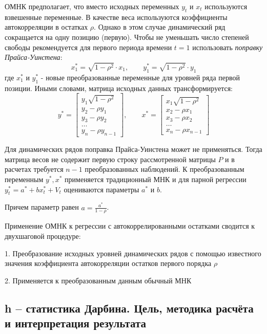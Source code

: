 \documentclass[aps,%
12pt,%
final,%
oneside,
onecolumn,%
musixtex, %
superscriptaddress,%
centertags]{article} %
\theoremstyle{plain}
\theoremstyle{definition}
\theoremstyle{remark}
\begin{document}
ОМНК предполагает, что вместо исходных переменных $y_t$ и $x_t$ используются взвешенные переменные. В качестве веса используются коэффициенты автокорреляции в остатках $\rho$. Однако в этом случае динамический ряд сокращается на одну позицию (первую). Чтобы не уменьшать число степеней свободы рекомендуется для первого периода времени $t=1$ использовать \textit{поправку Прайса-Уинстена}:
$$x_1^* = \sqrt{1-\rho^2} \cdot x_1, \qquad y_1^* = \sqrt{1-\rho^2} \cdot y_1$$
где $x_1^*$ и $y_1^*$ - новые преобразованные переменные для уровней ряда первой позиции. Иными словами, матрица исходных данных трансформируется:
$$ y^* = \begin{bmatrix}
	y_1 \sqrt{1-\rho^2} \\
	y_2 - \rho y_1 \\ 
	y_3 -\rho y_2 \\
	\ldots \\
	y_n -\rho y_{n-1}
\end{bmatrix}, \qquad
x^* = \begin{bmatrix}
	x_1 \sqrt{1-\rho^2} \\
	x_2 - \rho x_1 \\ 
	x_3 -\rho x_2 \\
	\ldots \\
	x_n -\rho x_{n-1}
\end{bmatrix}$$

Для динамических рядов поправка Прайса-Уинстена может не применяться. Тогда матрица весов не содержит первую строку рассмотренной матрицы $P$ и в расчетах требуется $n-1$ преобразованных наблюдений. К преобразованным переменным $y^*, x^*$ применяется традиционный МНК и для парной регрессии $y_t^* = a^* + bx_t^* + V_t$ оцениваются параметры $a^*$ и $b$.

Причем параметр равен $a = \frac{a^*}{1-\rho}$. 

Применение ОМНК к регрессии с автокоррелированными остатками сводится к двухшаговой процедуре:

1. Преобразование исходных уровней динамических рядов с помощью известного значения коэффициента автокорреляции остатков первого порядка $\rho$

2. Применяется к преобразованным данным обычный МНК 

\newpage
\subsection{h – статистика Дарбина. Цель, методика расчёта и интерпретация результата}
\end{document}

